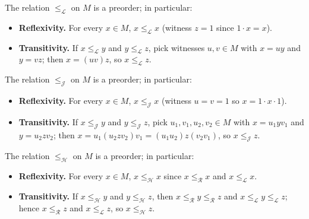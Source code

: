 \begin{lemma}
\label{lem:LRel-preorder}
The relation \(\le_{\mathcal L}\) on \(M\) is a preorder; in particular:
\begin{itemize}
  \item \textbf{Reflexivity.} For every \(x\in M\), \(x \le_{\mathcal L} x\) (witness \(z=1\) since \(1\cdot x = x\)).
  \item \textbf{Transitivity.} If \(x \le_{\mathcal L} y\) and \(y \le_{\mathcal L} z\), pick witnesses \(u,v\in M\) with \(x = u y\) and \(y = v z\); then \(x = (uv) z\), so \(x \le_{\mathcal L} z\).
\end{itemize}
\leanok
{}
\end{lemma}

\begin{lemma}
\label{lem:JRel-preorder}
The relation \(\le_{\mathcal J}\) on \(M\) is a preorder; in particular:
\begin{itemize}
  \item \textbf{Reflexivity.} For every \(x\in M\), \(x \le_{\mathcal J} x\) (witness \(u=v=1\) so \(x=1\cdot x\cdot 1\)).
  \item \textbf{Transitivity.} If \(x \le_{\mathcal J} y\) and \(y \le_{\mathcal J} z\), pick \(u_1,v_1,u_2,v_2\in M\) with \(x = u_1 y v_1\) and \(y = u_2 z v_2\); then
        \(x = u_1 (u_2 z v_2) v_1 = (u_1 u_2) z (v_2 v_1)\), so \(x \le_{\mathcal J} z\).
\end{itemize}
\leanok
{}
\end{lemma}

\begin{lemma}
\label{lem:HRel-preorder}
The relation \(\le_{\mathcal H}\) on \(M\) is a preorder; in particular:
\begin{itemize}
  \item \textbf{Reflexivity.} For every \(x\in M\), \(x \le_{\mathcal H} x\) since \(x \le_{\mathcal R} x\) and \(x \le_{\mathcal L} x\).
  \item \textbf{Transitivity.} If \(x \le_{\mathcal H} y\) and \(y \le_{\mathcal H} z\), then \(x \le_{\mathcal R} y \le_{\mathcal R} z\) and \(x \le_{\mathcal L} y \le_{\mathcal L} z\); hence \(x \le_{\mathcal R} z\) and \(x \le_{\mathcal L} z\), so \(x \le_{\mathcal H} z\).
\end{itemize}
\leanok
{}
\end{lemma}
